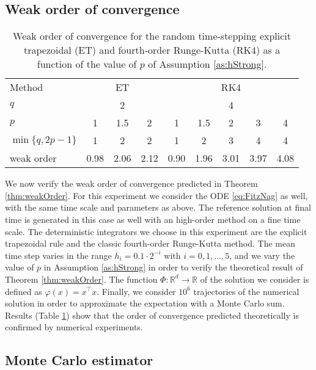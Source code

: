 \documentclass{siamart1116}
\numberwithin{theorem}{section}
\renewcommand{\phi}{\varphi}
\newcommand{\R}{\mathbb{R}}
\begin{document}
\subsection{Weak order of convergence}

\begin{table}[t]
	\centering
	\begin{tabular}{l|ccc|ccccc}
		\toprule
		Method & \multicolumn{3}{c|}{ET} & \multicolumn{5}{c}{RK4} \\ 
		\cmidrule(l{2pt}r{2pt}){2-4} \cmidrule(l{2pt}r{2pt}){5-9} 
		$q$ & \multicolumn{3}{c|}{2} & \multicolumn{5}{c}{4} \\
		$p$ & 1 & 1.5 & 2 & 1 & 1.5 & 2 & 3 & 4\\
		$\min\{q, 2p - 1\}$ & 1 & 2 & 2 & 1 & 2 & 3 & 4 & 4 \\
		weak order & 0.98 & 2.06 & 2.12 & 0.90 & 1.96 & 3.01 & 3.97 & 4.08 \\
		\bottomrule
	\end{tabular}
	\caption{Weak order of convergence for the random time-stepping explicit trapezoidal (ET) and fourth-order Runge-Kutta (RK4) as a function of the value of $p$ of Assumption \ref{as:hStrong}.}
	\label{tab:NumericalResultsWeakOrder}
\end{table}

We now verify the weak order of convergence predicted in Theorem \ref{thm:weakOrder}. For this experiment we consider the ODE \eqref{eq:FitzNag} as well, with the same time scale and parameters as above. The reference solution at final time is generated in this case as well with an high-order method on a fine time scale. The deterministic integrators we choose in this experiment are the explicit trapezoidal rule and the classic fourth-order Runge-Kutta method. The mean time step varies in the range $h_i = 0.1\cdot 2^{-i}$ with $i = 0, 1, \ldots, 5$, and we vary the value of $p$ in Assumption \ref{as:hStrong} in order to verify the theoretical result of Theorem \ref{thm:weakOrder}. The function $\Phi\colon\R^d\to\R$ of the solution we consider is defined as $\phi(x) = x^\top x$. Finally, we consider $10^6$ trajectories of the numerical solution in order to approximate the expectation with a Monte Carlo sum. Results (Table \ref{tab:NumericalResultsWeakOrder}) show that the order of convergence predicted theoretically is confirmed by numerical experiments. 

\subsection{Monte Carlo estimator}
\end{document}
